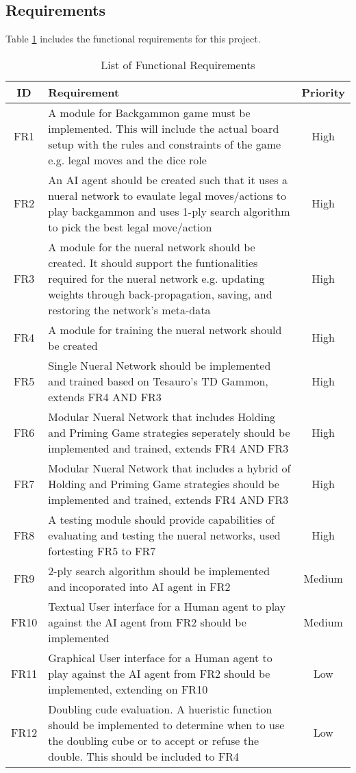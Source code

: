 \documentclass[12pt,a4paper]{article}
\begin{document}
\subsection{Requirements}
Table \ref{req} includes the functional requirements for this project.
\begin{table}[htb]
    \centering
    \caption{List of Functional Requirements}
    \vspace*{6pt}
    \label{req}
    \begin{tabular}{cp{12cm}c}
        \hline
        \hline
        ID & Requirement & Priority \\ 
        \hline
        FR1 & A module for Backgammon game must be implemented. This will include the actual board setup with the rules and constraints of the game e.g. legal moves and the dice role & High \\
        \hline
        FR2 & An AI agent should be created such that it uses a nueral network to evaulate legal moves/actions to play backgammon and uses 1-ply search algorithm to pick the best legal move/action & High \\
        \hline
        FR3 & A module for the nueral network should be created. It should support the funtionalities required for the nueral network e.g. updating weights through back-propagation, saving, and restoring the network's meta-data & High \\
        \hline
        FR4 & A module for training the nueral network should be created & High \\
        \hline
        FR5 & Single Nueral Network should be implemented and trained based on Tesauro's TD Gammon, extends FR4 AND FR3 & High \\
        \hline
        FR6 & Modular Nueral Network that includes Holding and Priming Game strategies seperately should be implemented and trained, extends FR4 AND FR3 & High \\
        \hline
        FR7 & Modular Nueral Network that includes a hybrid of Holding and Priming Game strategies should be implemented and trained, extends FR4 AND FR3 & High \\
        \hline
        FR8 & A testing module should provide capabilities of evaluating and testing the nueral networks, used fortesting FR5 to FR7 & High \\
        \hline
        FR9 & 2-ply search algorithm should be implemented and incoporated into AI agent in FR2 & Medium \\
        \hline
        FR10 & Textual User interface for a Human agent to play against the AI agent from FR2 should be implemented & Medium \\
        \hline
        FR11 & Graphical User interface for a Human agent to play against the AI agent from FR2 should be implemented, extending on FR10 & Low \\
        \hline
        FR12 & Doubling cude evaluation. A hueristic function should be implemented to determine when to use the doubling cube or to accept or refuse the double. This should be included to FR4 & Low \\
        \hline
    \end{tabular}
\end{table}
\end{document}
